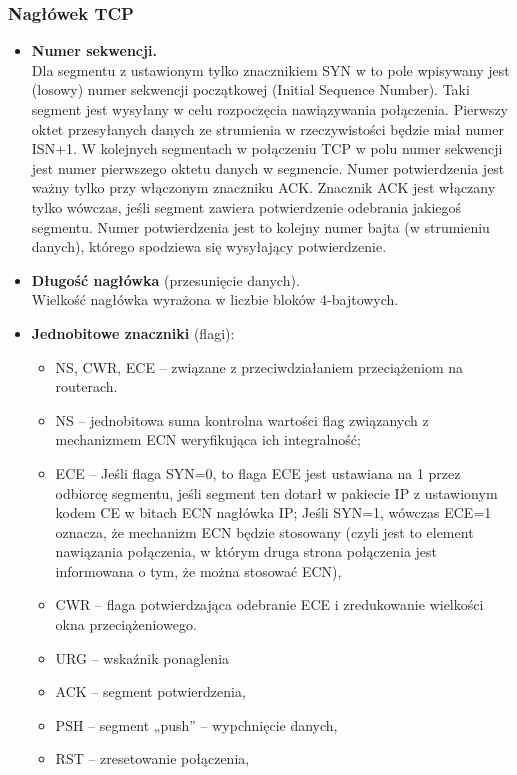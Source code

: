 \documentclass[a4paper]{article}
\begin{document}
\subsubsection{Nagłówek TCP}
\begin{itemize}
    \item \textbf{Numer sekwencji.}\\
    Dla segmentu z ustawionym tylko znacznikiem SYN w to pole wpisywany
jest (losowy) numer sekwencji początkowej (Initial Sequence Number). Taki segment jest
wysyłany w celu rozpoczęcia nawiązywania połączenia. Pierwszy oktet przesyłanych danych
ze strumienia w rzeczywistości będzie miał numer ISN+1.
W kolejnych segmentach w połączeniu TCP w polu numer sekwencji jest numer pierwszego
oktetu danych w segmencie.
Numer potwierdzenia jest ważny tylko przy włączonym znaczniku ACK. Znacznik ACK jest
włączany tylko wówczas, jeśli segment zawiera potwierdzenie odebrania jakiegoś segmentu.
Numer potwierdzenia jest to kolejny numer bajta (w strumieniu danych), którego spodziewa
się wysyłający potwierdzenie.
    \item \textbf{Długość nagłówka} (przesunięcie danych).\\
     Wielkość nagłówka wyrażona w liczbie bloków 4-bajtowych.
     \item \textbf{Jednobitowe znaczniki} (flagi):
     \begin{itemize}
         \item NS, CWR, ECE – związane z przeciwdziałaniem przeciążeniom na routerach.
         \item NS – jednobitowa suma kontrolna wartości flag związanych z
mechanizmem ECN weryfikująca ich integralność;
         \item ECE – Jeśli flaga SYN=0, to flaga ECE jest ustawiana na 1 przez odbiorcę
segmentu, jeśli segment ten dotarł w pakiecie IP z ustawionym kodem CE w bitach ECN nagłówka IP;
Jeśli SYN=1, wówczas ECE=1 oznacza, że mechanizm
ECN będzie stosowany (czyli jest to element nawiązania połączenia, w którym druga strona
połączenia jest informowana o tym, że można stosować ECN),
        \item CWR – flaga potwierdzająca odebranie ECE i
zredukowanie wielkości okna przeciążeniowego.
        \item  URG – wskaźnik ponaglenia
        \item ACK – segment potwierdzenia,
        \item PSH – segment „push” – wypchnięcie danych,
        \item RST – zresetowanie połączenia,

\end{itemize}
\end{itemize}
\end{document}
